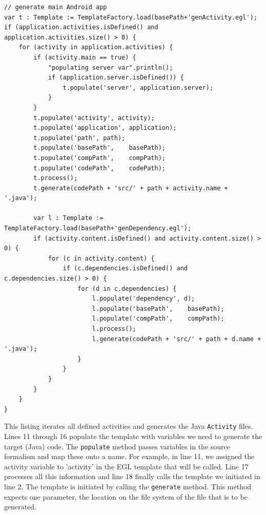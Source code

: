 \begin{lstlisting}[label=codegen-app,caption=Android code-generation, captionpos=t]
// generate main Android app
var t : Template := TemplateFactory.load(basePath+'genActivity.egl');
if (application.activities.isDefined() and application.activities.size() > 0) {
	for (activity in application.activities) {
		if (activity.main == true) {
			"populating server var".println();
			if (application.server.isDefined()) {
				t.populate('server', application.server);
			}
		}
		t.populate('activity', activity);
		t.populate('application', application);
		t.populate('path', path);
		t.populate('basePath',    basePath);
		t.populate('compPath',    compPath);
		t.populate('codePath',	  codePath);
		t.process();
		t.generate(codePath + 'src/' + path + activity.name + '.java');
	
		var l : Template := TemplateFactory.load(basePath+'genDependency.egl');
		if (activity.content.isDefined() and activity.content.size() > 0) {
			for (c in activity.content) {
				if (c.dependencies.isDefined() and c.dependencies.size() > 0) {
					for (d in c.dependencies) {
						l.populate('dependency', d);
						l.populate('basePath',    basePath);
						l.populate('compPath',    compPath);
						l.process();
						l.generate(codePath + 'src/' + path + d.name + '.java');
					}
				}
			}
		}
	}
}
\end{lstlisting}
This listing iterates all defined activities and generates the Java \texttt{Activity} files. Lines 11 through 16 populate the template with variables we need to generate the target (Java) code. The \texttt{populate} method passes variables in the source formalism and map these onto a name. For example, in line 11, we assigned the activity variable to 'activity' in the EGL template that will be called. Line 17 processes all this information and line 18 finally calls the template we initiated in line 2. The template is initiated by calling the \texttt{generate} method. This method expects one parameter, the location on the file system of the file that is to be generated.
